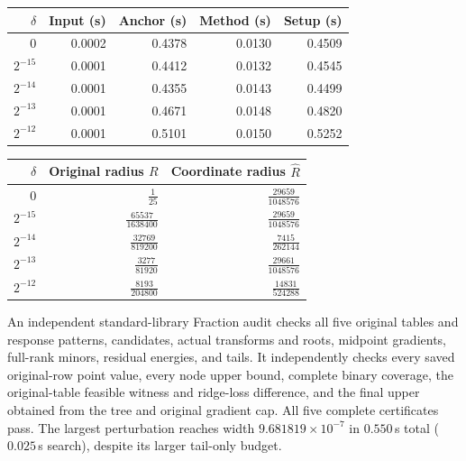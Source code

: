 \begin{center}
\small
\begin{tabular}{@{}rrrrr@{}}
\toprule
$\delta$ & Input (s) & Anchor (s) & Method (s) & Setup (s) \\
\midrule
$0$ & 0.0002 & 0.4378 & 0.0130 & 0.4509 \\
$2^{-15}$ & 0.0001 & 0.4412 & 0.0132 & 0.4545 \\
$2^{-14}$ & 0.0001 & 0.4355 & 0.0143 & 0.4499 \\
$2^{-13}$ & 0.0001 & 0.4671 & 0.0148 & 0.4820 \\
$2^{-12}$ & 0.0001 & 0.5101 & 0.0150 & 0.5252 \\
\bottomrule
\end{tabular}
\end{center}
\begin{center}
\small
\begin{tabular}{@{}rrr@{}}
\toprule
$\delta$ & Original radius $R$ & Coordinate radius $\widehat R$ \\
\midrule
$0$ & $\tfrac{1}{25}$ & $\tfrac{29659}{1048576}$ \\[2pt]
$2^{-15}$ & $\tfrac{65537}{1638400}$ & $\tfrac{29659}{1048576}$ \\[2pt]
$2^{-14}$ & $\tfrac{32769}{819200}$ & $\tfrac{7415}{262144}$ \\[2pt]
$2^{-13}$ & $\tfrac{3277}{81920}$ & $\tfrac{29661}{1048576}$ \\[2pt]
$2^{-12}$ & $\tfrac{8193}{204800}$ & $\tfrac{14831}{524288}$ \\[2pt]
\bottomrule
\end{tabular}
\end{center}
An independent standard-library Fraction audit checks all five original tables and response patterns, candidates, actual transforms and roots, midpoint gradients, full-rank minors, residual energies, and tails. It independently checks every saved original-row point value, every node upper bound, complete binary coverage, the original-table feasible witness and ridge-loss difference, and the final upper obtained from the tree and original gradient cap. All five complete certificates pass. The largest perturbation reaches width $9.681819\times10^{-7}$ in $0.550$\,s total ($0.025$\,s search), despite its larger tail-only budget.

